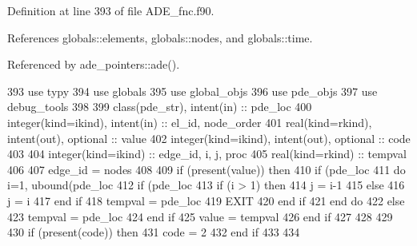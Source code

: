 Definition at line 393 of file A\+D\+E\+\_\+fnc.\+f90.



References globals\+::elements, globals\+::nodes, and globals\+::time.



Referenced by ade\+\_\+pointers\+::ade().


\begin{DoxyCode}
393       \textcolor{keywordtype}{use }typy
394       \textcolor{keywordtype}{use }globals
395       \textcolor{keywordtype}{use }global_objs
396       \textcolor{keywordtype}{use }pde_objs
397       \textcolor{keywordtype}{use }debug_tools
398       
399       \textcolor{keywordtype}{class}(pde_str), \textcolor{keywordtype}{intent(in)} :: pde\_loc
400       \textcolor{keywordtype}{integer(kind=ikind)}, \textcolor{keywordtype}{intent(in)}  :: el\_id, node\_order
401       \textcolor{keywordtype}{real(kind=rkind)}, \textcolor{keywordtype}{intent(out)}, \textcolor{keywordtype}{optional}    :: value
402       \textcolor{keywordtype}{integer(kind=ikind)}, \textcolor{keywordtype}{intent(out)}, \textcolor{keywordtype}{optional} :: code
403       
404       \textcolor{keywordtype}{integer(kind=ikind)} :: edge\_id, i, j, proc
405       \textcolor{keywordtype}{real(kind=rkind)} :: tempval
406       
407       edge\_id = nodes%
408       
409       \textcolor{keywordflow}{if} (\textcolor{keyword}{present}(\textcolor{keywordtype}{value})) \textcolor{keywordflow}{then}
410         \textcolor{keywordflow}{if} (pde\_loc%
411           \textcolor{keywordflow}{do} i=1, ubound(pde\_loc%
412             \textcolor{keywordflow}{if} (pde\_loc%
413               \textcolor{keywordflow}{if} (i > 1) \textcolor{keywordflow}{then}
414                 j = i-1
415               \textcolor{keywordflow}{else}
416                 j = i
417 \textcolor{keywordflow}{              end if}
418               tempval = pde\_loc%
419               \textcolor{keywordflow}{EXIT}
420 \textcolor{keywordflow}{            end if}
421 \textcolor{keywordflow}{          end do}
422         \textcolor{keywordflow}{else}
423           tempval =  pde\_loc%
424 \textcolor{keywordflow}{        end if}
425         \textcolor{keywordtype}{value} = tempval 
426 \textcolor{keywordflow}{      end if}
427 
428 
429       
430       \textcolor{keywordflow}{if} (\textcolor{keyword}{present}(code)) \textcolor{keywordflow}{then}
431         code = 2
432 \textcolor{keywordflow}{      end if}
433       
434 
\end{DoxyCode}


